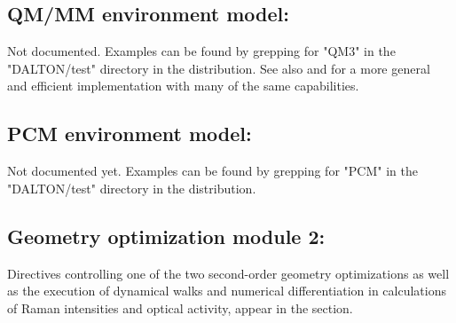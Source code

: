 \subsection{QM/MM environment model: }
\label{sec:qm3}

Not documented. Examples can be found by grepping for "QM3" in the "DALTON/test" directory in the distribution. See also  and  for a more general and efficient implementation with many of the same capabilities.

\subsection{PCM environment model: }
\label{sec:pcm}

Not documented yet. Examples can be found by grepping for "PCM" in the "DALTON/test" directory in the distribution.

\subsection{Geometry optimization module 2: }
\label{sec:abawalk}

Directives controlling one of the two second-order
geometry
optimizations  as well as the
execution of dynamical walks and numerical
differentiation in
calculations of Raman intensities and optical activity,
appear in the  section.

